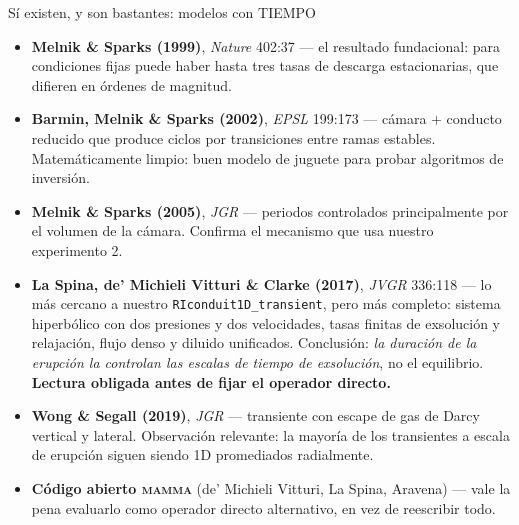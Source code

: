 \documentclass[aspectratio=169,10pt,t]{beamer}
\begin{document}
\begin{frame}{Sí existen, y son bastantes: modelos con TIEMPO}
\footnotesize
\begin{itemize}
  \item \textbf{Melnik \& Sparks (1999)}, \emph{Nature} 402:37 — el resultado
    fundacional: para condiciones fijas puede haber \alert{hasta tres tasas de
    descarga estacionarias}, que difieren en órdenes de magnitud.
  \item \textbf{Barmin, Melnik \& Sparks (2002)}, \emph{EPSL} 199:173 — cámara
    $+$ conducto reducido que produce ciclos por transiciones entre ramas
    estables. Matemáticamente limpio: buen modelo de juguete para probar
    algoritmos de inversión.
  \item \textbf{Melnik \& Sparks (2005)}, \emph{JGR} — periodos controlados
    principalmente por el \alert{volumen de la cámara}. Confirma el mecanismo
    que usa nuestro experimento 2.
  \item \textbf{La Spina, de' Michieli Vitturi \& Clarke (2017)}, \emph{JVGR}
    336:118 — \alert{lo más cercano a nuestro \texttt{RIconduit1D\_transient},
    pero más completo}: sistema hiperbólico con dos presiones y dos velocidades,
    tasas finitas de exsolución y relajación, flujo denso y diluido unificados.
    Conclusión: \emph{la duración de la erupción la controlan las escalas de
    tiempo de exsolución}, no el equilibrio. \textbf{Lectura obligada antes de
    fijar el operador directo.}
  \item \textbf{Wong \& Segall (2019)}, \emph{JGR} — transiente con escape de gas
    de Darcy vertical y lateral. Observación relevante: \alert{la mayoría de los
    transientes a escala de erupción siguen siendo 1D promediados
    radialmente}.
  \item \textbf{Código abierto \textsc{mamma}} (de' Michieli Vitturi, La Spina,
    Aravena) — vale la pena evaluarlo como operador directo alternativo, en vez
    de reescribir todo.
\end{itemize}
\end{frame}
\end{document}
